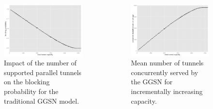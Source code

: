 \documentclass{beamer}
\begin{document}
\begin{frame}
	\begin{columns}
		\begin{figure}
			\includegraphics[width=\columnwidth]{../../chapters/041-mobilenetsmeasuring/images/R-monolithic-blocking.pdf}
			\caption{Impact of the number of supported parallel tunnels on the blocking probability for the traditional GGSN model.}
		\end{figure}

		\begin{figure}
			\includegraphics[width=\columnwidth]{../../chapters/041-mobilenetsmeasuring/images/R-monolithic-tunnelusage.pdf}
			\caption{Mean number of tunnels concurrently served by the GGSN for incrementally increasing capacity.}
		\end{figure}
	\end{columns}
\end{frame}
\end{document}
